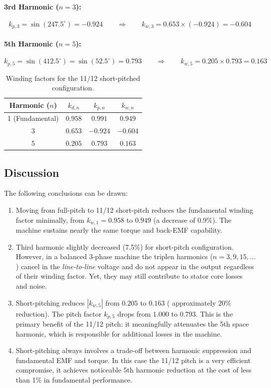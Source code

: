 \documentclass[12pt, a4paper]{article}
\begin{document}
\paragraph{3rd Harmonic ($n = 3$):}
\[k_{p,3} = \sin(247.5^\circ) = -0.924 \qquad \Rightarrow \qquad k_{w,3} = 0.653 \times (-0.924) = -0.604\]

\paragraph{5th Harmonic ($n = 5$):}
\[k_{p,5} = \sin(412.5^\circ) = \sin(52.5^\circ) = 0.793 \qquad \Rightarrow \qquad k_{w,5} = 0.205 \times 0.793 = 0.163\]

\begin{table}[h!]
\centering
\caption{Winding factors for the 11/12 short-pitched configuration.}
\begin{tabular}{cccc}
\toprule
\textbf{Harmonic ($n$)} & \textbf{$k_{d,n}$} & \textbf{$k_{p,n}$} & \textbf{$k_{w,n}$} \\
\midrule
1 (Fundamental) & $0.958$ & $0.991$ & $0.949$ \\
3               & $0.653$ & $-0.924$ & $-0.604$ \\
5               & $0.205$ & $0.793$ & $0.163$ \\
\bottomrule
\end{tabular}
\end{table}

\subsection{Discussion}
The following conclusions can be drawn:

\begin{enumerate}
    \item Moving from full-pitch to 11/12 short-pitch reduces the fundamental winding factor minimally, from $k_{w,1} = 0.958$ to $0.949$ (a decrease of 0.9\%). The machine sustains nearly the same torque and back-EMF capability.

    \item Third harmonic slightly decreased (7.5\%) for short-pitch configuration. However, in a balanced 3-phase machine the triplen harmonics ($n = 3, 9, 15, \ldots$) cancel in the \emph{line-to-line} voltage and do not appear in the output regardless of their winding factor. Yet, they may still contribute to stator core losses and noise.

    \item Short-pitching reduces $|k_{w,5}|$ from $0.205$ to $0.163$ ( approximately 20\% reduction). The pitch factor $k_{p,5}$ drops from $1.000$ to $0.793$. This is the primary benefit of the 11/12 pitch: it meaningfully attenuates the 5th space harmonic, which is responsible for additional losses in the machine.

    \item Short-pitching always involves a trade-off between harmonic suppression and fundamental EMF and torque. In this case the 11/12 pitch is a very efficient compromise, it achieves noticeable 5th harmonic reduction at the cost of less than 1\% in fundamental performance.
\end{enumerate}
\end{document}
